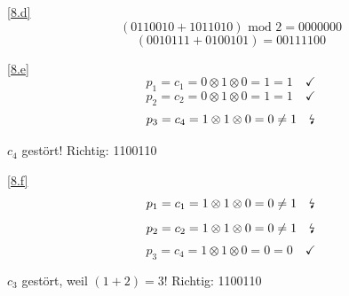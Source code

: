 \documentclass[a4paper, margins=2cm]{homework}
\begin{document}
\begin{solution}
	\ref{8.d}
	\[ (0110010 + 1011010) \text{ mod } 2 = 0000000 \]
	\[ (0010111 + 0100101) = 00111100 \]

	\ref{8.e}
	\[ p_1 = c_1 = 0 \otimes 1 \otimes 0 = 1 = 1 \quad \checkmark \]
	\[ p_2 = c_2 = 0 \otimes 1 \otimes 0 = 1 = 1 \quad \checkmark \]
	\[ p_3 = c_4 = 1 \otimes 1 \otimes 0 = 0 \neq 1 \quad \text{\lightning} \]
	\begin{center}
		$c_4$ gestört! Richtig: 1100110
	\end{center}

	\ref{8.f}
	\[ p_1 = c_1 = 1 \otimes 1 \otimes 0 = 0 \neq 1 \quad \text{\lightning} \]
	\[ p_2 = c_2 = 1 \otimes 1 \otimes 0 = 0 \neq 1 \quad \text{\lightning} \]
	\[ p_3 = c_4 = 1 \otimes 1 \otimes 0 = 0 = 0 \quad \checkmark \]
	\begin{center}
		$c_3$ gestört, weil $(1+2) = 3$! Richtig: 1100110
	\end{center}
\end{solution}
\end{document}
